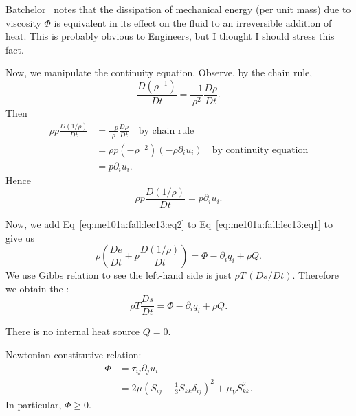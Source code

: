 \begin{remark}
Batchelor~\cite[p.153]{batchelor1973introduction} notes that the
dissipation of mechanical energy (per unit mass) due to viscosity
$\Phi$ is equivalent in its effect on the fluid to an irreversible
addition of heat. This is probably obvious to Engineers, but I thought
I should stress this fact.
\end{remark}

\begin{node}
Now, we manipulate the continuity equation. Observe, by the chain rule,
\begin{equation}
\frac{D(\rho^{-1})}{Dt}=\frac{-1}{\rho^{2}}\frac{D\rho}{Dt}.
\end{equation}
Then
\begin{subequations}
  \begin{align}
\rho p\frac{D(1/\rho)}{Dt}
&=\frac{-p}{\rho}\frac{D\rho}{Dt}\quad\mbox{by chain rule}\\
&=\rho p(-\rho^{-2})(-\rho\partial_{i}u_{i})\quad\mbox{by continuity equation}\\
&=p\partial_{i}u_{i}.
  \end{align}
\end{subequations}
Hence
\begin{equation}\label{eq:me101a:fall:lec13:eq2}
\boxed{\rho p\frac{D(1/\rho)}{Dt}
=p\partial_{i}u_{i}.}
\end{equation}
\end{node}

\begin{node}
Now, we add Eq~\eqref{eq:me101a:fall:lec13:eq2} to Eq~\eqref{eq:me101a:fall:lec13:eq1}
to give us
\begin{equation}
\rho\left(\frac{De}{Dt}+p\frac{D(1/\rho)}{Dt}\right)=\Phi-\partial_{i}q_{i}+\rho Q.
\end{equation}
We use Gibbs relation to see the left-hand side is just $\rho T\,(D s/D t)$.
Therefore we obtain the :
\begin{equation}\label{eq:fall:lec13:entropy-equation}
\boxed{\rho T\frac{D s}{D t}=\Phi-\partial_{i}q_{i}+\rho Q.}
\end{equation}
\end{node}

\begin{assume}
There is no internal heat source $Q=0$.
\end{assume}

\begin{assume}
Newtonian constitutive relation:
\begin{subequations}
  \begin{align}
\Phi &= \tau_{ij}\partial_{j}u_{i}\\
&= 2\mu(S_{ij}-\frac{1}{3}S_{kk}\delta_{ij})^{2}+\mu_{V}S_{kk}^{2}.
  \end{align}
\end{subequations}
In particular, $\Phi\geq0$.
\end{assume}

